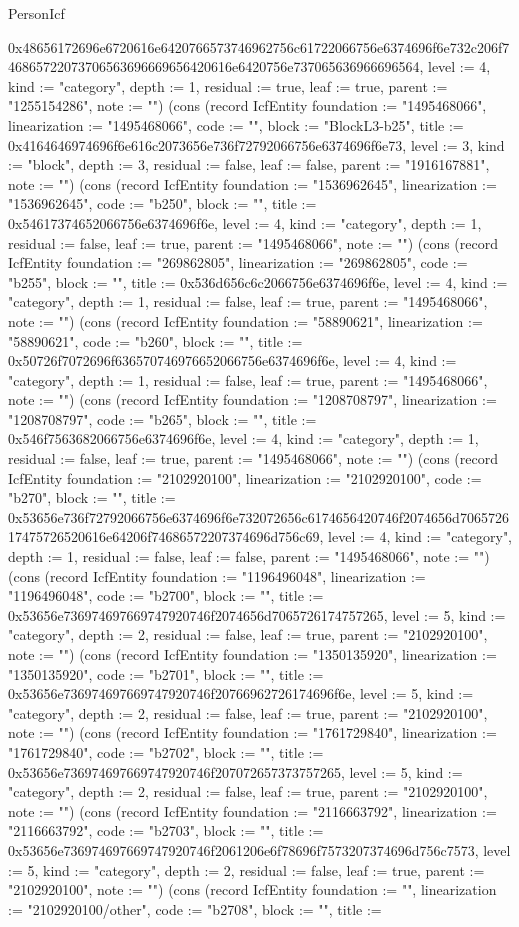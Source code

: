 \begin{lexlean}{PersonIcf}
\begin{semanticmodule}
{0x48656172696e6720616e6420766573746962756c61722066756e6374696f6e732c206f746865722073706563696669656420616e6420756e737065636966696564, level := 4, kind := "category", depth := 1, residual := true, leaf := true, parent := "1255154286", note := ""}) (cons (record IcfEntity {foundation := "1495468066", linearization := "1495468066", code := "", block := "BlockL3-b25", title := 0x4164646974696f6e616c2073656e736f72792066756e6374696f6e73, level := 3, kind := "block", depth := 3, residual := false, leaf := false, parent := "1916167881", note := ""}) (cons (record IcfEntity {foundation := "1536962645", linearization := "1536962645", code := "b250", block := "", title := 0x54617374652066756e6374696f6e, level := 4, kind := "category", depth := 1, residual := false, leaf := true, parent := "1495468066", note := ""}) (cons (record IcfEntity {foundation := "269862805", linearization := "269862805", code := "b255", block := "", title := 0x536d656c6c2066756e6374696f6e, level := 4, kind := "category", depth := 1, residual := false, leaf := true, parent := "1495468066", note := ""}) (cons (record IcfEntity {foundation := "58890621", linearization := "58890621", code := "b260", block := "", title := 0x50726f7072696f636570746976652066756e6374696f6e, level := 4, kind := "category", depth := 1, residual := false, leaf := true, parent := "1495468066", note := ""}) (cons (record IcfEntity {foundation := "1208708797", linearization := "1208708797", code := "b265", block := "", title := 0x546f7563682066756e6374696f6e, level := 4, kind := "category", depth := 1, residual := false, leaf := true, parent := "1495468066", note := ""}) (cons (record IcfEntity {foundation := "2102920100", linearization := "2102920100", code := "b270", block := "", title := 0x53656e736f72792066756e6374696f6e732072656c6174656420746f2074656d706572617475726520616e64206f74686572207374696d756c69, level := 4, kind := "category", depth := 1, residual := false, leaf := false, parent := "1495468066", note := ""}) (cons (record IcfEntity {foundation := "1196496048", linearization := "1196496048", code := "b2700", block := "", title := 0x53656e736974697669747920746f2074656d7065726174757265, level := 5, kind := "category", depth := 2, residual := false, leaf := true, parent := "2102920100", note := ""}) (cons (record IcfEntity {foundation := "1350135920", linearization := "1350135920", code := "b2701", block := "", title := 0x53656e736974697669747920746f20766962726174696f6e, level := 5, kind := "category", depth := 2, residual := false, leaf := true, parent := "2102920100", note := ""}) (cons (record IcfEntity {foundation := "1761729840", linearization := "1761729840", code := "b2702", block := "", title := 0x53656e736974697669747920746f207072657373757265, level := 5, kind := "category", depth := 2, residual := false, leaf := true, parent := "2102920100", note := ""}) (cons (record IcfEntity {foundation := "2116663792", linearization := "2116663792", code := "b2703", block := "", title := 0x53656e736974697669747920746f2061206e6f78696f7573207374696d756c7573, level := 5, kind := "category", depth := 2, residual := false, leaf := true, parent := "2102920100", note := ""}) (cons (record IcfEntity {foundation := "", linearization := "2102920100/other", code := "b2708", block := "", title := }
\end{semanticmodule}
\end{lexlean}
